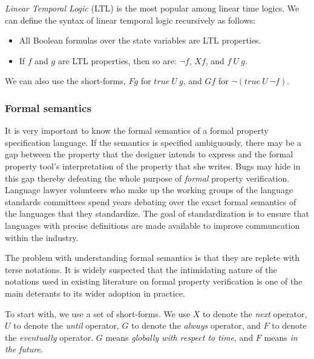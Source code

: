\noindent
{\em Linear Temporal Logic} (LTL) is the most popular among linear time
logics. We can define the syntax of linear temporal logic recursively as follows:
\begin{itemize}

\item All Boolean formulas over the state variables are LTL properties.

\item If $f$ and $g$ are LTL properties, then so are: $\neg f$, $Xf$, and
	$f\ U\ g$.

\end{itemize}
\noindent
We can also use the short-forms, $Fg$ for $true\ U\ g$, and $Gf$ for
$\neg (true\ U\ \neg f)$.
\subsubsection{Formal semantics} 
\noindent
It is very important to know the formal semantics of a formal property
specification language. If the semantics is specified ambiguously, there may
be a gap between the property that the designer intends to express and the
formal property tool's interpretation of the property that she writes.
Bugs may hide in this gap thereby defeating the whole purpose of {\em formal}
property verification. Language lawyer volunteers who make up the working
groups of the language standards committees spend years debating
over the exact formal semantics of the languages that they standardize.
The goal of standardization is to ensure that languages with precise 
definitions are made available to improve communcation within the
industry.

\noindent
The problem with understanding formal semantics is that they are replete with
terse notations. It is widely suspected that the intimidating nature of the
notations used in existing literature on formal property verification is one
of the main deterants to its wider adoption in practice.


\noindent
To start with, we use a set of short-forms. We use $X$ to denote
the {\em next} operator, $U$ to denote the {\em until} operator, $G$ to
denote the {\em always} operator, and $F$ to denote the {\em eventually} 
operator. $G$ means {\em globally with respect to time}, and $F$ means
{\em in the future}.

